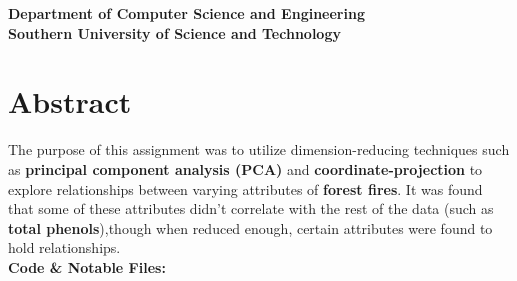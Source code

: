 \documentclass[titlepage,a4paper,12pt,thmsb]{report}
\begin{document}
\begin{titlepage}
\begin{center}
\vskip 0.5cm

\large{\bf Department of Computer Science and Engineering} \\
\vskip 0.5cm
\Large{\bf Southern University of Science and Technology}\\
\vskip 0.5cm
{\centering {}}
\end{center}
\pagebreak
\end{titlepage}


\chapter*{Abstract}
The purpose of this assignment was to utilize dimension-reducing techniques such as {\bf principal component analysis (PCA)} and {\bf coordinate-projection} to explore relationships between varying attributes of {\bf forest fires}. It was found that some of these attributes didn’t correlate with the rest of the data (such as {\bf total phenols}),though when reduced enough, certain attributes were found to hold relationships.
\vspace*{0.5cm}\\
{\large \bf {Code \& Notable Files:}}
\newline{}
{ }
\end{document}
